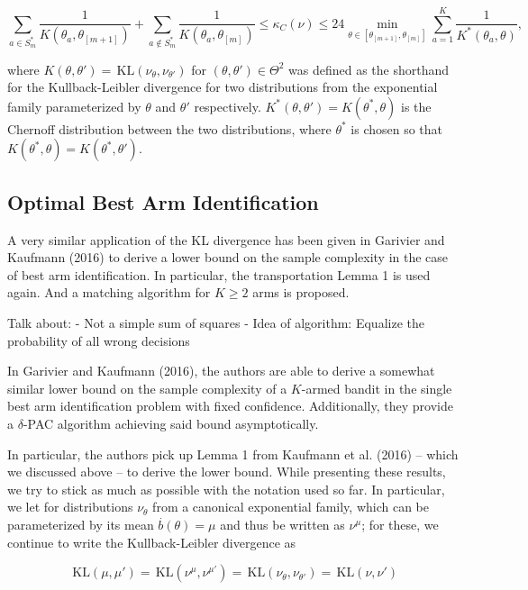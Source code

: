 \documentclass[12pt,]{article}
\newcommand{\KL}{\,\text{KL}}
\begin{document}
\begin{equation*}
\sum_{a \in S^*_m} \frac{1}{K(\theta_a, \theta_{[m+1]})} + \sum_{a \notin S^*_m} \frac{1}{K(\theta_a,\theta_{[m]})} \leq \kappa_C(\nu) \leq 24 \min_{\theta \in [\theta_{[m+1]},\theta_{[m]}]} \sum_{a=1}^{K} \frac{1}{K^*(\theta_a, \theta)},
\end{equation*}

where \(K(\theta, \theta') = \KL(\nu_{\theta}, \nu_{\theta'})\) for
\((\theta, \theta') \in \Theta^2\) was defined as the shorthand for the
Kullback-Leibler divergence for two distributions from the exponential
family parameterized by \(\theta\) and \(\theta'\) respectively.
\(K^*(\theta,\theta') = K(\theta^*, \theta)\) is the Chernoff
distribution between the two distributions, where \(\theta^*\) is chosen
so that \(K(\theta^*,\theta) = K(\theta^*, \theta')\).

\subsection{Optimal Best Arm
Identification}\label{optimal-best-arm-identification}

A very similar application of the KL divergence has been given in
Garivier and Kaufmann (2016) to derive a lower bound on the sample
complexity in the case of best arm identification. In particular, the
transportation Lemma 1 is used again. And a matching algorithm for
\(K \geq 2\) arms is proposed.

Talk about: - Not a simple sum of squares - Idea of algorithm: Equalize
the probability of all wrong decisions

In Garivier and Kaufmann (2016), the authors are able to derive a
somewhat similar lower bound on the sample complexity of a \(K\)-armed
bandit in the single best arm identification problem with fixed
confidence. Additionally, they provide a \(\delta\)-PAC algorithm
achieving said bound asymptotically.

In particular, the authors pick up Lemma 1 from Kaufmann et al. (2016)
-- which we discussed above -- to derive the lower bound. While
presenting these results, we try to stick as much as possible with the
notation used so far. In particular, we let for distributions
\(\nu_{\theta}\) from a canonical exponential family, which can be
parameterized by its mean \(\stackrel{.}{b}(\theta) = \mu\) and thus be
written as \(\nu^{\mu}\); for these, we continue to write the
Kullback-Leibler divergence as

\begin{equation*}
\KL(\mu, \mu') = \KL(\nu^{\mu},\nu^{\mu'}) = \KL(\nu_{\theta},\nu_{\theta'}) = \KL(\nu, \nu')
\end{equation*}
\end{document}
